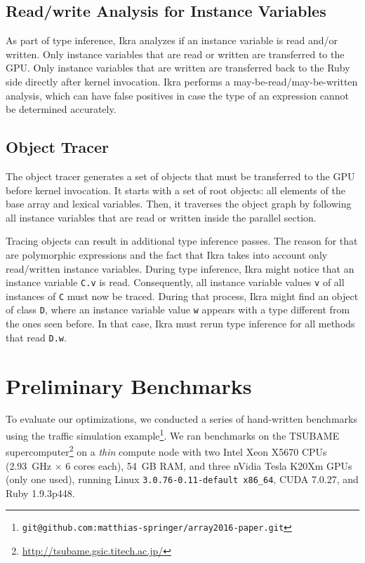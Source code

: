 \documentclass[preprint]{sigplanconf}
\begin{document}
\subsection{Read/write Analysis for Instance Variables}
\label{sec:impl_copyback}
As part of type inference, Ikra analyzes if an instance variable is read and/or written. Only instance variables that are read or written are transferred to the GPU. Only instance variables that are written are transferred back to the Ruby side directly after kernel invocation. Ikra performs a may-be-read/may-be-written analysis, which can have false positives in case the type of an expression cannot be determined accurately.

\subsection{Object Tracer}
\label{sec:impl_tracer}
The object tracer generates a set of objects that must be transferred to the GPU before kernel invocation. It starts with a set of root objects: all elements of the base array and lexical variables. Then, it traverses the object graph by following all instance variables that are read or written inside the parallel section. 

Tracing objects can result in additional type inference passes. The reason for that are polymorphic expressions and the fact that Ikra takes into account only read/written instance variables. During type inference, Ikra might notice that an instance variable \texttt{C.v} is read. Consequently, all instance variable values \texttt{v} of all instances of \texttt{C} must now be traced. During that process, Ikra might find an object of class \texttt{D}, where an instance variable value \texttt{w} appears with a type different from the ones seen before. In that case, Ikra must rerun type inference for all methods that read \texttt{D.w}.

\section{Preliminary Benchmarks}
To evaluate our optimizations, we conducted a series of hand-written benchmarks using the traffic simulation example\footnote{\texttt{git@github.com:matthias-springer/array2016-paper.git}}. We ran benchmarks on the TSUBAME supercomputer\footnote{\url{http://tsubame.gsic.titech.ac.jp/}} on a \emph{thin} compute node with two Intel Xeon X5670 CPUs (2.93~GHz $\times$ 6 cores each), 54~GB RAM, and three nVidia Tesla K20Xm GPUs (only one used), running Linux \texttt{3.0.76-0.11-default x86\_64}, CUDA 7.0.27, and Ruby 1.9.3p448.
\end{document}
